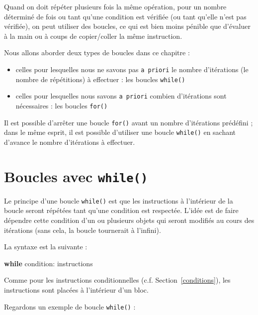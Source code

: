 \documentclass[
  12pt,
]{book}
\newenvironment{Shaded}{\begin{snugshade}}{\end{snugshade}}
\newcommand{\ControlFlowTok}[1]{\textcolor[rgb]{0.13,0.29,0.53}{\textbf{#1}}}
\newcommand{\NormalTok}[1]{#1}
\providecommand{\tightlist}{%
  \setlength{\itemsep}{0pt}\setlength{\parskip}{0pt}}
\numberwithin{equation}{section}
\newcounter{countremarque}
\newenvironment{remarque}{%
 \refstepcounter{countremarque}
    \begin{tcolorbox}[width=\linewidth, colback=blue!3, boxrule=0.5pt,arc=0pt,title = Remarque \thecountremarque]
    }%
    {
    \end{tcolorbox}
    }
\numberwithin{countremarque}{section}
\begin{document}
Quand on doit répéter plusieurs fois la même opération, pour un nombre déterminé de fois ou tant qu'une condition est vérifiée (ou tant qu'elle n'est pas vérifiée), on peut utiliser des boucles, ce qui est bien moins pénible que d'évaluer à la main ou à coups de copier/coller la même instruction.

Nous allons aborder deux types de boucles dans ce chapitre :

\begin{itemize}
\tightlist
\item
  celles pour lesquelles nous ne savons pas \texttt{a\ priori} le nombre d'itérations (le nombre de répétitions) à effectuer : les boucles \texttt{while()}
\item
  celles pour lesquelles nous savons \texttt{a\ priori} combien d'itérations sont nécessaires : les boucles \texttt{for()}
\end{itemize}

\begin{remarque}
Il est possible d'arrêter une boucle \texttt{for()} avant un nombre d'itérations prédéfini ; dans le même esprit, il est possible d'utiliser une boucle \texttt{while()} en sachant d'avance le nombre d'itérations à effectuer.
\end{remarque}

\section{\texorpdfstring{Boucles avec \texttt{while()}}{Boucles avec while()}}\label{boucles-avec-while}

Le principe d'une boucle \texttt{while()} est que les instructions à l'intérieur de la boucle seront répétées tant qu'une condition est respectée. L'idée est de faire dépendre cette condition d'un ou plusieurs objets qui seront modifiés au cours des itérations (sans cela, la boucle tournerait à l'infini).

La syntaxe est la suivante :

\begin{Shaded}
\begin{Highlighting}[]
\ControlFlowTok{while}\NormalTok{ condition:}
\NormalTok{  instructions}
\end{Highlighting}
\end{Shaded}

Comme pour les instructions conditionnelles (c.f. Section~\ref{conditions}), les instructions sont placées à l'intérieur d'un bloc.

Regardons un exemple de boucle \texttt{while()} :
\end{document}
